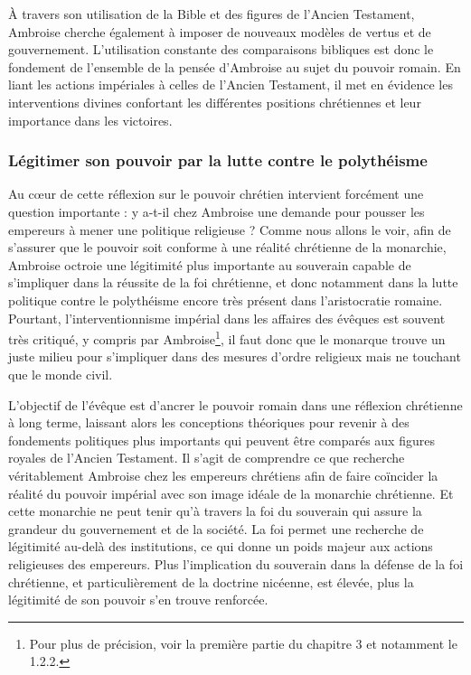 \bigskip

À travers son utilisation de la Bible et des figures de l'Ancien Testament, Ambroise cherche également à imposer de nouveaux modèles de vertus et de gouvernement. L'utilisation constante des comparaisons bibliques est donc le fondement de l'ensemble de la pensée d'Ambroise au sujet du pouvoir romain. En liant les actions impériales à celles de l'Ancien Testament, il met en évidence les interventions divines confortant les différentes positions chrétiennes et leur importance dans les victoires.

\bigskip

\subsubsection{Légitimer son pouvoir par la lutte contre le polythéisme}

Au cœur de cette réflexion sur le pouvoir chrétien intervient forcément une question importante : y a-t-il chez Ambroise une demande pour pousser les empereurs à mener une politique religieuse ? Comme nous allons le voir, afin de s'assurer que le pouvoir soit conforme à une réalité chrétienne de la monarchie, Ambroise octroie une légitimité plus importante au souverain capable de s'impliquer dans la réussite de la foi chrétienne, et donc notamment dans la lutte politique contre le polythéisme encore très présent dans l'aristocratie romaine. Pourtant, l'interventionnisme impérial dans les affaires des évêques est souvent très critiqué, y compris par Ambroise\footnote{Pour plus de précision, voir la première partie du chapitre 3 et notamment le 1.2.2.}, il faut donc que le monarque trouve un juste milieu pour s'impliquer dans des mesures d'ordre religieux mais ne touchant que le monde civil.

\bigskip

L'objectif de l'évêque est d'ancrer le pouvoir romain dans une réflexion chrétienne à long terme, laissant alors les conceptions théoriques pour revenir à des fondements politiques plus importants qui peuvent être comparés aux figures royales de l'Ancien Testament. Il s'agit de comprendre ce que recherche véritablement Ambroise chez les empereurs chrétiens afin de faire coïncider la réalité du pouvoir impérial avec son image idéale de la monarchie chrétienne. Et cette monarchie ne peut tenir qu'à travers la foi du souverain qui assure la grandeur du gouvernement et de la société. La foi permet une recherche de légitimité au-delà des institutions, ce qui donne un poids majeur aux actions religieuses des empereurs. Plus l'implication du souverain dans la défense de la foi chrétienne, et particulièrement de la doctrine nicéenne, est élevée, plus la légitimité de son pouvoir s'en trouve renforcée.

